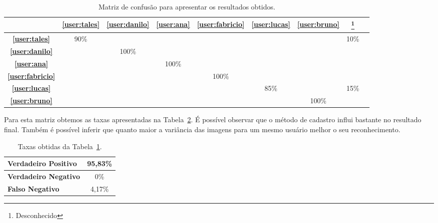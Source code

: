 	\begin{table}[H]
		\begin{center}
			\caption{Matriz de confusão para apresentar os resultados obtidos.}
			\label{tab:matriz-confusao2}
			  \begin{tabular}{|c|c|c|c|c|c|c|c|c|}
				\hline  & \bf \ref{user:tales} & \bf \ref{user:danilo} & \bf
				\ref{user:ana} & \bf \ref{user:fabricio} & \bf \ref{user:lucas} & \bf
				\ref{user:bruno} &  \bf *\footnote[1]{Desconhecido}\\
				 
				\hline \bf \ref{user:tales} 		& 90\% & 			& 		 & 			&   	 & 			& 10\%		\\
				\hline \bf \ref{user:danilo} 	& 		 & 100\%& 		 & 			&   	 & 			& 		 		\\
				\hline \bf \ref{user:ana} 			& 		 & 			& 100\%& 			&   	 & 			& 		    \\
				\hline \bf \ref{user:fabricio} & 		 & 			& 		 &100\%      &      & 			&      		\\
				\hline \bf \ref{user:lucas} 		& 		 & 			& 		 & 			& 85\% & 			& 15\%		\\
				\hline \bf \ref{user:bruno} 		& 		 & 			& 		 & 			& 		 & 100\%& 		  	\\
				\hline
			\end{tabular}
		\end{center}
	\end{table}

	Para esta matriz obtemos as taxas apresentadas na Tabela~\ref{tab:taxas2}. É
	possível observar que o método de cadastro influi bastante no resultado final.
	Também é possível inferir que quanto maior a variância das imagens para um
	mesmo usuário melhor o seu reconhecimento.

	\begin{table}[H]
		\begin{center}
			\caption{Taxas obtidas da Tabela~\ref{tab:matriz-confusao2}.}
			\label{tab:taxas2}
			\begin{tabular}{|l|c|}
				\hline \bf Verdadeiro Positivo & 95,83\% \\
				\hline \bf Verdadeiro Negativo & 0\% \\
				\hline \bf Falso Negativo & 4,17\% \\
				\hline
			\end{tabular}
		\end{center}
	\end{table}

	

